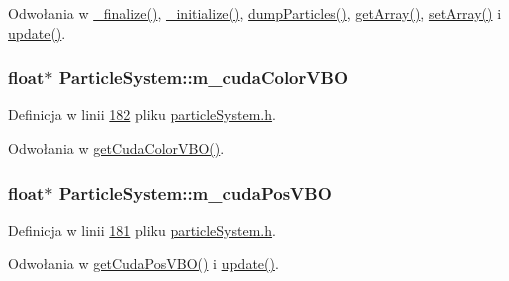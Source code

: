 Odwołania w \hyperlink{particle_system_8cpp_source_l00205}{\-\_\-finalize()}, \hyperlink{particle_system_8cpp_source_l00123}{\-\_\-initialize()}, \hyperlink{particle_system_8cpp_source_l00331}{dump\-Particles()}, \hyperlink{particle_system_8cpp_source_l00346}{get\-Array()}, \hyperlink{particle_system_8cpp_source_l00374}{set\-Array()} i \hyperlink{particle_system_8cpp_source_l00238}{update()}.

\hypertarget{class_particle_system_a39d210b57da5f7f4a2c23f4fc0b43ea1}{
\subsubsection[{m\-\_\-cuda\-Color\-V\-B\-O}]{\setlength{\rightskip}{0pt plus 5cm}float$\ast$ Particle\-System\-::m\-\_\-cuda\-Color\-V\-B\-O\hspace{0.3cm}{\ttfamily [protected]}}}\label{class_particle_system_a39d210b57da5f7f4a2c23f4fc0b43ea1}


Definicja w linii \hyperlink{particle_system_8h_source_l00182}{182} pliku \hyperlink{particle_system_8h_source}{particle\-System.\-h}.



Odwołania w \hyperlink{particle_system_8h_source_l00066}{get\-Cuda\-Color\-V\-B\-O()}.

\hypertarget{class_particle_system_aba18245745f621d90186862f1a559d9e}{
\subsubsection[{m\-\_\-cuda\-Pos\-V\-B\-O}]{\setlength{\rightskip}{0pt plus 5cm}float$\ast$ Particle\-System\-::m\-\_\-cuda\-Pos\-V\-B\-O\hspace{0.3cm}{\ttfamily [protected]}}}\label{class_particle_system_aba18245745f621d90186862f1a559d9e}


Definicja w linii \hyperlink{particle_system_8h_source_l00181}{181} pliku \hyperlink{particle_system_8h_source}{particle\-System.\-h}.



Odwołania w \hyperlink{particle_system_8h_source_l00062}{get\-Cuda\-Pos\-V\-B\-O()} i \hyperlink{particle_system_8cpp_source_l00238}{update()}.

